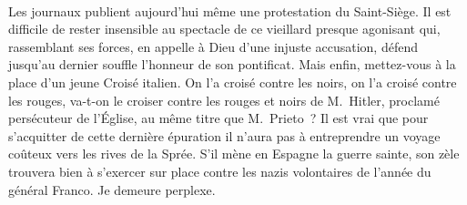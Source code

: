 \documentclass[french,twoside]{book} %
\newcommand{\astertri}{\medskip\par\centerline{\color{rubric}\large\selectfont{\syms ✻\,✻\,✻}}\medskip\par}%
\begin{document}
\astertri

\noindent  \par
Les journaux publient aujourd’hui même une protestation du Saint-Siège. Il est difficile de rester insensible au spectacle de ce vieillard presque agonisant qui, rassemblant ses forces, en appelle à Dieu d’une injuste accusation, défend jusqu’au dernier souffle l’honneur de son pontificat. Mais enfin, mettez-vous à la place d’un jeune Croisé italien. On l’a croisé contre les noirs, on l’a croisé contre les rouges, va-t-on le croiser contre les rouges et noirs de M. Hitler, proclamé persécuteur de l’Église, au même titre que M. Prieto ? Il est vrai que pour s’acquitter de cette dernière épuration il n’aura pas à entreprendre un voyage coûteux vers les rives de la Sprée. S’il mène en Espagne la guerre sainte, son zèle trouvera bien à s’exercer sur place contre les nazis volontaires de l’année du général Franco. Je demeure perplexe.\par
 \par

\astertri
\end{document}
